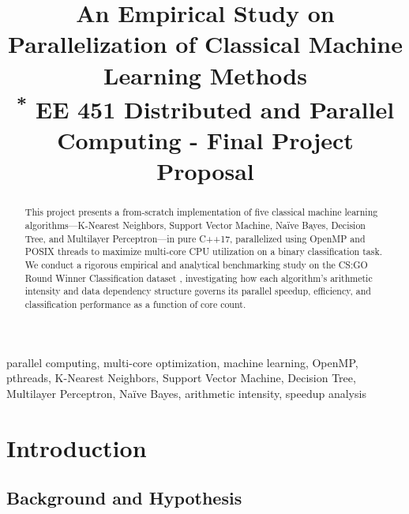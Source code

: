 \documentclass[conference]{IEEEtran}
\begin{document}
\title{An Empirical Study on Parallelization of Classical Machine Learning Methods\\
{\footnotesize \textsuperscript{*} EE 451 Distributed and Parallel Computing - Final Project Proposal}
}

\author{
}

\maketitle

\begin{abstract}
This project presents a from-scratch implementation of five classical machine learning algorithms---K-Nearest Neighbors, Support Vector Machine, Naïve Bayes, Decision Tree, and Multilayer Perceptron---in pure C++17, parallelized using OpenMP and POSIX threads to maximize multi-core CPU utilization on a binary classification task. We conduct a rigorous empirical and analytical benchmarking study on the CS:GO Round Winner Classification dataset \cite{lillelund2020csgo}, investigating how each algorithm's arithmetic intensity and data dependency structure governs its parallel speedup, efficiency, and classification performance as a function of core count.
\end{abstract}

\begin{IEEEkeywords}
parallel computing, multi-core optimization, machine learning, OpenMP, pthreads, K-Nearest Neighbors, Support Vector Machine, Decision Tree, Multilayer Perceptron, Naïve Bayes, arithmetic intensity, speedup analysis
\end{IEEEkeywords}

\section{Introduction}

\subsection{Background and Hypothesis}
\end{document}
